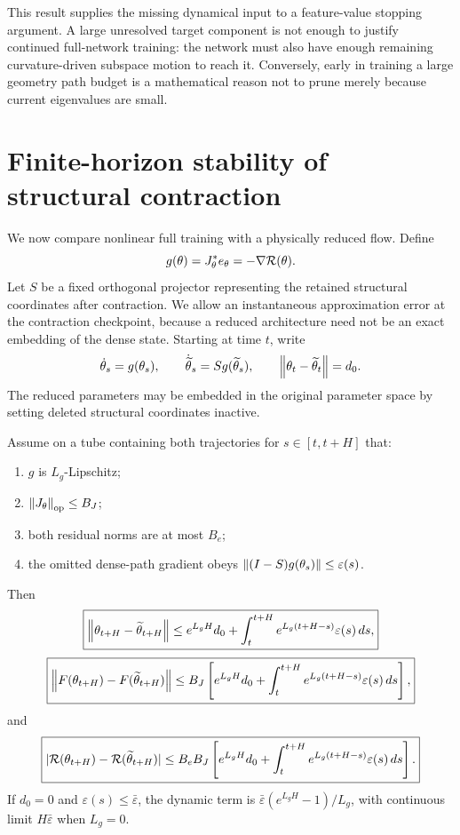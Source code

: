 \begin{remark}
This result supplies the missing dynamical input to a feature-value stopping argument. A large unresolved target component is not enough to justify continued full-network training: the network must also have enough remaining curvature-driven subspace motion to reach it. Conversely, early in training a large geometry path budget is a mathematical reason not to prune merely because current eigenvalues are small.
\end{remark}

\section{Finite-horizon stability of structural contraction}
We now compare nonlinear full training with a physically reduced flow. Define
\[
g(\theta)=J_\theta^\ast e_\theta=-\nabla\mathcal R(\theta).
\]
Let $S$ be a fixed orthogonal projector representing the retained structural coordinates after contraction. We allow an instantaneous approximation error at the contraction checkpoint, because a reduced architecture need not be an exact embedding of the dense state. Starting at time $t$, write
\[
\dot\theta_s=g(\theta_s),
\qquad
\dot{\widetilde\theta}_s=Sg(\widetilde\theta_s),
\qquad
\left\lVert \theta_t-\widetilde\theta_t\right\rVert=d_0.
\]
The reduced parameters may be embedded in the original parameter space by setting deleted structural coordinates inactive.

\begin{theorem}\label{thm:gronwall}
Assume on a tube containing both trajectories for $s\in[t,t+H]$ that:
\begin{enumerate}[label=(\roman*)]
\item $g$ is $L_g$-Lipschitz;
\item $\left\lVert J_\theta\right\rVert_{\mathrm{op}}\le B_J$;
\item both residual norms are at most $B_e$;
\item the omitted dense-path gradient obeys
$\left\lVert (I-S)g(\theta_s)\right\rVert\le\varepsilon(s)$.
\end{enumerate}
Then
\[
\boxed{
\left\lVert \theta_{t+H}-\widetilde\theta_{t+H}\right\rVert
\le
e^{L_gH}d_0
+\int_t^{t+H}e^{L_g(t+H-s)}\varepsilon(s)\,ds,}
\]
\[
\boxed{
\left\lVert F(\theta_{t+H})-F(\widetilde\theta_{t+H})\right\rVert
\le
B_J\left[
e^{L_gH}d_0
+\int_t^{t+H}e^{L_g(t+H-s)}\varepsilon(s)\,ds
\right],}
\]
and
\[
\boxed{
|\mathcal R(\theta_{t+H})-\mathcal R(\widetilde\theta_{t+H})|
\le
B_eB_J\left[
e^{L_gH}d_0
+\int_t^{t+H}e^{L_g(t+H-s)}\varepsilon(s)\,ds
\right].}
\]
If $d_0=0$ and $\varepsilon(s)\le\bar\varepsilon$, the dynamic term is
$\bar\varepsilon(e^{L_gH}-1)/L_g$, with continuous limit $H\bar\varepsilon$ when $L_g=0$.
\end{theorem}

